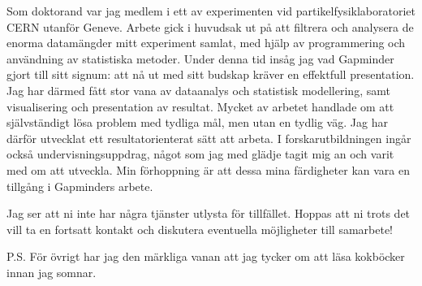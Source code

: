 \documentclass[11pt, a4paper]{../awesome-cv} %
\begin{document}
\begin{cvletter}
Som doktorand var jag medlem i ett av experimenten vid partikelfysiklaboratoriet CERN utanför Geneve.
Arbete gick i huvudsak ut på att filtrera och analysera de enorma datamängder mitt experiment samlat, med hjälp av programmering och användning av statistiska metoder.
Under denna tid insåg jag vad Gapminder gjort till sitt signum: att nå ut med sitt budskap kräver en effektfull presentation. 
Jag har därmed fått stor vana av dataanalys och statistisk modellering, samt visualisering och presentation av resultat.
Mycket av arbetet handlade om att självständigt lösa problem med tydliga mål, men utan en tydlig väg.
Jag har därför utvecklat ett resultatorienterat sätt att arbeta.
I forskarutbildningen ingår också undervisningsuppdrag, något som jag med glädje tagit mig an och varit med om att utveckla. 
Min förhoppning är att dessa mina färdigheter kan vara en tillgång i Gapminders arbete.

Jag ser att ni inte har några tjänster utlysta för tillfället.
Hoppas att ni trots det vill ta en fortsatt kontakt och diskutera eventuella möjligheter till samarbete!


\end{cvletter}


\makeletterclosing %

P.S. För övrigt har jag den märkliga vanan att jag tycker om att läsa kokböcker innan jag somnar.

\end{document}

